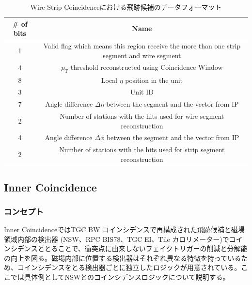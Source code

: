 \begin{table}[]
    \centering
    \caption{Wire Strip Coincidenceにおける飛跡候補のデータフォーマット}
    \label{tab:WS}
    \begin{tabular}{|c|c|}
    \hline
    \# of bits & Name                                                                                        \\ \hline\hline
    1          & Valid flag which means this region receive the more than one strip segment and wire segment \\ \hline
    4          & $p_{\mathrm{T}}$ threshold reconstructed using Coincidence Window                           \\ \hline
    8          & Local $\eta$ position in the unit                                                           \\ \hline
    3          & Unit ID                                                                                     \\ \hline
    7          & Angle difference $\Delta\eta$ between the segment and the vector from IP                    \\ \hline
    2          & Number of stations with the hits used for wire segment reconstruction                       \\ \hline
    4          & Angle difference $\Delta\phi$ between the segment and the vector from IP                    \\ \hline
    2          & Number of stations with the hits used for strip segment reconstruction                      \\ \hline
    \end{tabular}
\end{table}

\subsection{Inner Coincidence}
\subsubsection*{コンセプト}
Inner CoincidenceではTGC BW コインシデンスで再構成された飛跡候補と磁場領域内部の検出器 (NSW、RPC BIS78、TGC EI、Tile カロリメーター)でコインシデンスととることで、衝突点に由来しないフェイクトリガーの削減と\pt 分解能の向上を図る。磁場内部に位置する検出器はそれぞれ異なる特徴を持っているため、コインシデンスをとる検出器ごとに独立したロジックが用意されている。ここでは具体例としてNSWとのコインシデンスロジックについて説明する。

